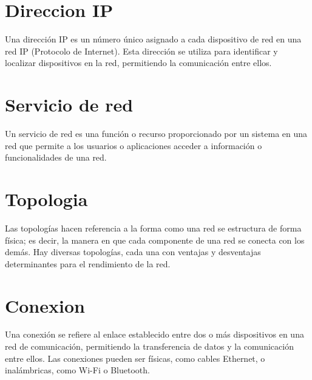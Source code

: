 \documentclass[a4paper,12pt]{article}
\begin{document}
\section{Direccion IP}

Una dirección IP es un número único asignado a cada dispositivo de red en una red IP (Protocolo de Internet). 
Esta dirección se utiliza para identificar y localizar dispositivos en la red, permitiendo la comunicación entre ellos. 


\section{Servicio de red}
Un servicio de red es una función o recurso proporcionado por un sistema en una red que permite a los usuarios o aplicaciones acceder a información o funcionalidades de una red.

\section{Topologia}

Las topologías hacen referencia a la forma como una red se estructura de forma física; es decir, la manera en que cada componente de una red se conecta con los demás. Hay diversas topologías, cada una con ventajas y desventajas determinantes para el rendimiento de la red.


\section{Conexion}
Una conexión se refiere al enlace establecido entre dos o más dispositivos en una red de comunicación, permitiendo la transferencia de datos y la comunicación entre ellos. Las conexiones pueden ser físicas, como cables Ethernet, o inalámbricas, como Wi-Fi o Bluetooth.
\end{document}
